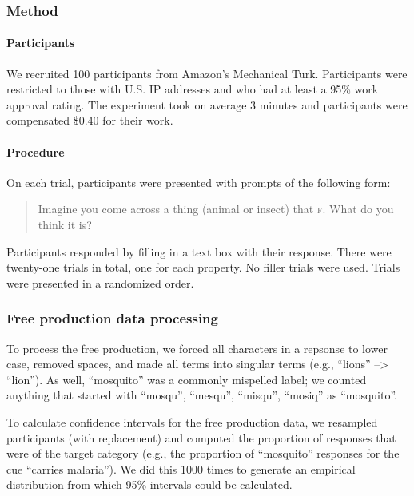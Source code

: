 \documentclass[english,floatsintext,man]{apa6}
\theoremstyle{definition}
\theoremstyle{definition}
\theoremstyle{definition}
\theoremstyle{remark}
\begin{document}
\subsubsection{Method}\label{method-8}

\paragraph{Participants}\label{participants-8}

We recruited 100 participants from Amazon's Mechanical Turk.
Participants were restricted to those with U.S. IP addresses and who had
at least a 95\% work approval rating. The experiment took on average 3
minutes and participants were compensated \$0.40 for their work.

\paragraph{Procedure}\label{procedure-5}

On each trial, participants were presented with prompts of the following
form:

\begin{quotation}
Imagine you come across a thing (animal or insect) that \textsc{f}.
What do you think it is?
\end{quotation}

Participants responded by filling in a text box with their response.
There were twenty-one trials in total, one for each property. No filler
trials were used. Trials were presented in a randomized order.

\subsubsection{Free production data
processing}\label{free-production-data-processing}

To process the free production, we forced all characters in a repsonse
to lower case, removed spaces, and made all terms into singular terms
(e.g., \enquote{lions} --\textgreater{} \enquote{lion}). As well,
\enquote{mosquito} was a commonly mispelled label; we counted anything
that started with \enquote{mosqu}, \enquote{mesqu}, \enquote{misqu},
\enquote{mosiq} as \enquote{mosquito}.

To calculate confidence intervals for the free production data, we
resampled participants (with replacement) and computed the proportion of
responses that were of the target category (e.g., the proportion of
\enquote{mosquito} responses for the cue \enquote{carries malaria}). We
did this 1000 times to generate an empirical distribution from which
95\% intervals could be calculated.
\end{document}
